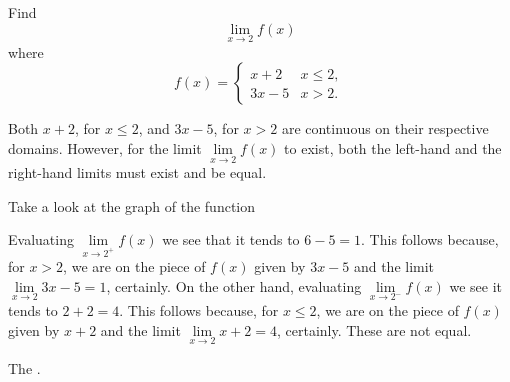 \documentclass{ximera}
\begin{document}
\begin{question}
  Find 
  \[
  \displaystyle \lim_{x\to 2} f(x)
  \]
  where
  \[
  f(x) = \left\{\begin{array}{cl} x+2 & x\leq 2, \\ 3x-5 & x>2. \end{array}\right.
  \]
  \begin{solution}
    \begin{hint}
     Both $x+2$, for $x\le2$, and $3x-5$, for $x>2$ are continuous on their respective domains. However, for the limit $\lim\limits_{x\to2}f(x)$ to exist, both the left-hand and the right-hand limits must exist and be equal.
    \end{hint}
     \begin{hint}
    	Take a look at the graph of the function
    \begin{center}
      \end{center} 
    \end{hint}
    \begin{hint}
     Evaluating $\lim\limits_{x\to2^{+}}f(x)$ we see that it tends to $6-5=1$. This follows because, for $x>2$, we are on the piece of $f(x)$ given by $3x-5$ and the limit $\lim\limits_{x\to2}3x-5=1$, certainly. On the other hand, evaluating $\lim\limits_{x\to2^{-}}f(x)$ we see it tends to $2+2=4$. This follows because, for $x\le2$, we are on the piece of $f(x)$ given by $x+2$ and the limit $\lim\limits_{x\to2}x+2=4$, certainly. These are not equal.
    \end{hint}
     The 
    .
  \end{solution}
\end{question}
\end{document}

